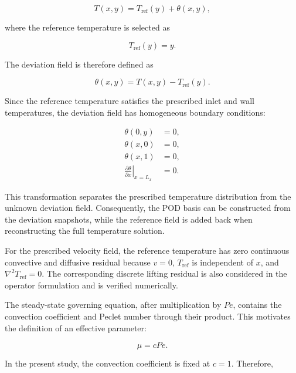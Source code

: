 \begin{equation}
    T(x,y)=T_{\mathrm{ref}}(y)+\theta(x,y),
    \label{eq:temperature_decomposition}
\end{equation}

where the reference temperature is selected as

\begin{equation}
    T_{\mathrm{ref}}(y)=y.
    \label{eq:reference_temperature}
\end{equation}

The deviation field is therefore defined as

\begin{equation}
    \theta(x,y)=T(x,y)-T_{\mathrm{ref}}(y).
\end{equation}

Since the reference temperature satisfies the prescribed inlet and wall temperatures, the deviation field has homogeneous boundary conditions:

\begin{align}
    \theta(0,y)&=0,\\
    \theta(x,0)&=0,\\
    \theta(x,1)&=0,\\
    \left.\frac{\partial\theta}{\partial x}\right|_{x=L_x}
    &=0.
\end{align}

This transformation separates the prescribed temperature distribution from the unknown deviation field. Consequently, the POD basis can be constructed from the deviation snapshots, while the reference field is added back when reconstructing the full temperature solution.

For the prescribed velocity field, the reference temperature has zero continuous convective and diffusive residual because $v=0$, $T_{\mathrm{ref}}$ is independent of $x$, and $\nabla^2T_{\mathrm{ref}}=0$. The corresponding discrete lifting residual is also considered in the operator formulation and is verified numerically.

The steady-state governing equation, after multiplication by $Pe$, contains the convection coefficient and Peclet number through their product. This motivates the definition of an effective parameter:

\begin{equation}
    \boxed{\mu=cPe.}
    \label{eq:effective_parameter}
\end{equation}

In the present study, the convection coefficient is fixed at $c=1$. Therefore,

